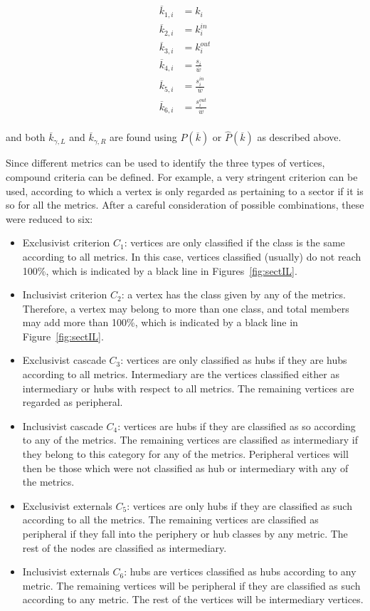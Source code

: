\documentclass[%
 aip,
 jmp,%
 amsmath,amssymb,
 reprint,%
]{revtex4-1}
\begin{document}
\begin{equation}
\begin{split}
\overline{k}_{1,i}&=k_i \\
\overline{k}_{2,i}&=k_i^{in} \\
\overline{k}_{3,i}&=k_i^{out} \\
\overline{k}_{4,i}&=\frac{s_i}{\overline{w}} \\
\overline{k}_{5,i}&=\frac{s_i^{in}}{\overline{w}} \\
\overline{k}_{6,i}&=\frac{s_i^{out}}{\overline{w}} \\
\end{split}
\end{equation}

\noindent and both $\overline{k}_{\gamma,L}$ and $\overline{k}_{\gamma,R}$ are found using $P(\overline{k})$ or $\hat{P}(\overline{k})$ as described above.

Since different metrics can be used to identify the three types of vertices, compound criteria can be defined. For example, a very stringent criterion can be used, according to which a vertex is only regarded as pertaining to a sector if it is so for all the metrics. After a careful consideration of possible combinations, these were reduced to six:

\begin{itemize}
    \item Exclusivist criterion $C_1$:  vertices are only classified if the class is the same according to all metrics. In this case, vertices classified (usually) do not reach 100\%, which is indicated by a black line in Figures~\ref{fig:sectIL}.
    \item Inclusivist criterion $C_2$: a vertex has the class given by any of the metrics. Therefore, a vertex may belong to more than one class, and total members may add more than 100\%, which is indicated by a black line in Figure~\ref{fig:sectIL}.
    \item Exclusivist cascade $C_3$: vertices are only classified as hubs if they are hubs according to all metrics. Intermediary are the vertices classified either as intermediary or hubs with respect to all metrics. The remaining vertices are regarded as peripheral.
    \item Inclusivist cascade $C_4$: vertices are hubs if they are classified as so according to any of the metrics. The remaining vertices are classified as intermediary if they belong to this category for any of the metrics. Peripheral vertices will then be those which were not classified as hub or intermediary with any of the metrics. 
    \item Exclusivist externals $C_5$: vertices are only hubs if they are classified as such according to all the metrics. The remaining vertices are classified as peripheral if they fall into the periphery or hub classes by any metric. The rest of the nodes are classified as intermediary.
    \item Inclusivist externals $C_6$: hubs are vertices classified as hubs according to any metric. The remaining vertices will be peripheral if they are classified as such according to any metric. The rest of the vertices will be intermediary vertices.
\end{itemize}
\end{document}
